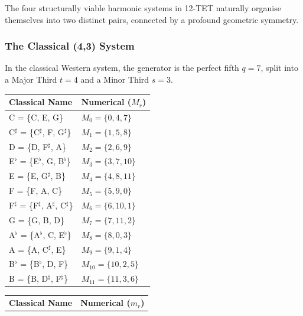 \documentclass[11pt,letterpaper]{amsart}
\begin{document}
The four structurally viable harmonic systems in 12-TET naturally organise themselves into two distinct pairs, connected by a profound geometric symmetry.

\subsubsection{The Classical (4,3) System}

In the classical Western system, the generator is the perfect fifth $q=7$, split into a Major Third $t=4$ and a Minor Third $s=3$. 

{\tiny \begin{table}[H]
    \centering
    \begin{minipage}{0.48\textwidth}
        \centering
        \begin{tabular}{ll}
        \toprule
        \textbf{Classical Name} & \textbf{Numerical ($M_r$)} \\
        \midrule
        C = \{C, E, G\} & $M_0 = \{0, 4, 7\}$ \\
        C$^\sharp$ = \{C$^\sharp$, F, G$^\sharp$\} & $M_1 = \{1, 5, 8\}$ \\
        D = \{D, F$^\sharp$, A\} & $M_2 = \{2, 6, 9\}$ \\
        E$^\flat$ = \{E$^\flat$, G, B$^\flat$\} & $M_3 = \{3, 7, 10\}$ \\
        E = \{E, G$^\sharp$, B\} & $M_4 = \{4, 8, 11\}$ \\
        F = \{F, A, C\} & $M_5 = \{5, 9, 0\}$ \\
        F$^\sharp$ = \{F$^\sharp$, A$^\sharp$, C$^\sharp$\} & $M_6 = \{6, 10, 1\}$ \\
        G = \{G, B, D\} & $M_7 = \{7, 11, 2\}$ \\
        A$^\flat$ = \{A$^\flat$, C, E$^\flat$\} & $M_8 = \{8, 0, 3\}$ \\
        A = \{A, C$^\sharp$, E\} & $M_9 = \{9, 1, 4\}$ \\
        B$^\flat$ = \{B$^\flat$, D, F\} & $M_{10} = \{10, 2, 5\}$ \\
        B = \{B, D$^\sharp$, F$^\sharp$\} & $M_{11} = \{11, 3, 6\}$ \\
        \bottomrule
        \end{tabular}
    \end{minipage}\hfill
    \begin{minipage}{0.48\textwidth}
        \centering
        \begin{tabular}{ll}
        \toprule
        \textbf{Classical Name} & \textbf{Numerical ($m_r$)} \\

\end{tabular}
\end{minipage}
\end{table}}
\end{document}
